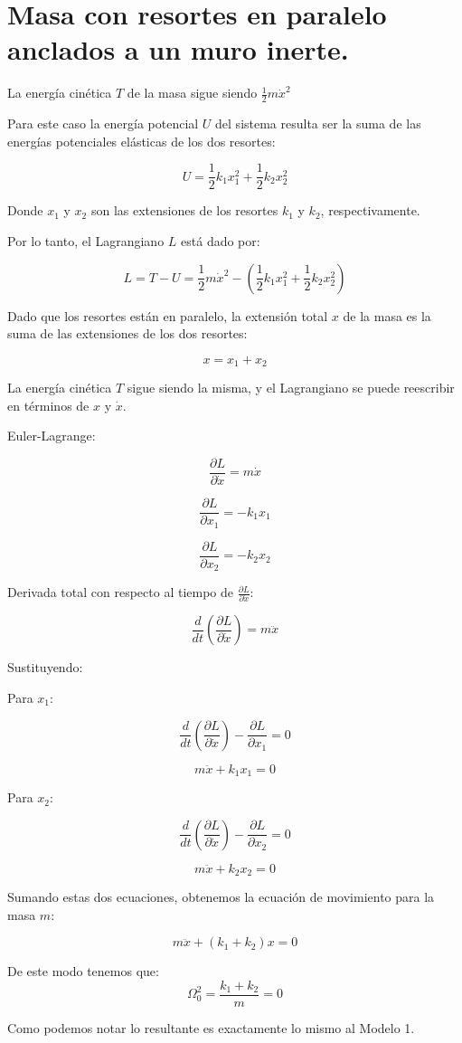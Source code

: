 \section{Masa con resortes en paralelo anclados a un muro inerte.}

La energía cinética $ T $ de la masa sigue siendo $ \frac{1}{2} m \dot{x}^2 $

Para este caso la energía potencial $ U $ del sistema resulta ser la suma de las energías potenciales elásticas de los dos resortes:

\[ U = \frac{1}{2} k_1 x_1^2 + \frac{1}{2} k_2 x_2^2 \]

Donde $ x_1 $ y $ x_2 $ son las extensiones de los resortes $ k_1 $ y $ k_2 $, respectivamente.

Por lo tanto, el Lagrangiano $ L $ está dado por:

\[ L = T - U = \frac{1}{2} m \dot{x}^2 - \left( \frac{1}{2} k_1 x_1^2 + \frac{1}{2} k_2 x_2^2 \right) \]

Dado que los resortes están en paralelo, la extensión total $ x $ de la masa es la suma de las extensiones de los dos resortes:

\[ x = x_1 + x_2 \]

La energía cinética $ T $ sigue siendo la misma, y el Lagrangiano se puede reescribir en términos de $ x $ y $ \dot{x} $.

Euler-Lagrange:


\[ \frac{\partial L}{\partial \dot{x}} = m \dot{x} \]

\[ \frac{\partial L}{\partial x_1} = -k_1 x_1 \]

\[ \frac{\partial L}{\partial x_2} = -k_2 x_2 \]

Derivada total con respecto al tiempo de $ \frac{\partial L}{\partial \dot{x}} $:

\[ \frac{d}{dt} \left( \frac{\partial L}{\partial \dot{x}} \right) = m \ddot{x} \]

Sustituyendo:

Para $ x_1 $:

\[ \frac{d}{dt} \left( \frac{\partial L}{\partial \dot{x}} \right) - \frac{\partial L}{\partial x_1} = 0 \]

\[ m \ddot{x} + k_1 x_1 = 0 \]

Para $ x_2 $:

\[ \frac{d}{dt} \left( \frac{\partial L}{\partial \dot{x}} \right) - \frac{\partial L}{\partial x_2} = 0 \]

\[ m \ddot{x} + k_2 x_2 = 0 \]

Sumando estas dos ecuaciones, obtenemos la ecuación de movimiento para la masa $ m $:

\[ m \ddot{x} + (k_1 + k_2) x = 0 \]

De este modo tenemos que:
\[ \Omega_0^2 = \displaystyle\frac{k_1 + k_2}{m} = 0 \]

Como podemos notar lo resultante es exactamente lo mismo al Modelo 1.
